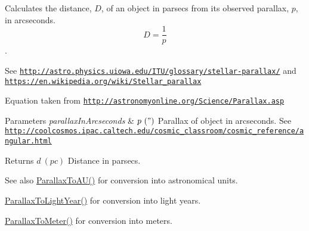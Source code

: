 Calculates the distance, $D$, of an object in parsecs from its observed parallax, $p$, in arcseconds. \[ D=\dfrac{1}{p}\]. 

See \href{http://astro.physics.uiowa.edu/ITU/glossary/stellar-parallax/}{\tt http\+://astro.\+physics.\+uiowa.\+edu/\+I\+T\+U/glossary/stellar-\/parallax/} and \href{https://en.wikipedia.org/wiki/Stellar_parallax}{\tt https\+://en.\+wikipedia.\+org/wiki/\+Stellar\+\_\+parallax}

Equation taken from \href{http://astronomyonline.org/Science/Parallax.asp}{\tt http\+://astronomyonline.\+org/\+Science/\+Parallax.\+asp}


\begin{DoxyParams}{Parameters}
{\em parallax\+In\+Arcseconds} & $ p\ (")$ Parallax of object in arcseconds. See \href{http://coolcosmos.ipac.caltech.edu/cosmic_classroom/cosmic_reference/angular.html}{\tt http\+://coolcosmos.\+ipac.\+caltech.\+edu/cosmic\+\_\+classroom/cosmic\+\_\+reference/angular.\+html} \\
\hline
\end{DoxyParams}
\begin{DoxyReturn}{Returns}
$ d\ (pc)$ Distance in parsecs. 
\end{DoxyReturn}
\begin{DoxySeeAlso}{See also}
\mbox{\hyperlink{group___e_g_x_phys-_astrophysic-_parallax_ga2085f91170baba79a7fcc8a0ba77d1eb}{Parallax\+To\+A\+U()}} for conversion into astronomical units. 

\mbox{\hyperlink{group___e_g_x_phys-_astrophysic-_parallax_gacaec31498f264e2a1dc285062a394de2}{Parallax\+To\+Light\+Year()}} for conversion into light years. 

\mbox{\hyperlink{group___e_g_x_phys-_astrophysic-_parallax_ga94912bf8b98a04cccab8ef19eaa89b6a}{Parallax\+To\+Meter()}} for conversion into meters. 
\end{DoxySeeAlso}
